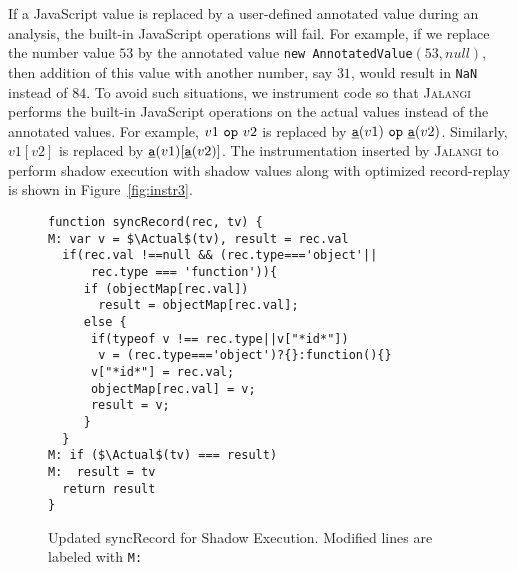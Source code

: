 \documentclass{sig-alternate}
\def\jalangi{\textsc{Jalangi}}
\newcommand \dsl [1] {\ensuremath{{\tt #1}}\xspace}
\newcommand \usl [1] {\mbox{\underline{\tt #1}}\xspace}
\newcommand \Actual{\usl{a}}
\begin{document}
If a JavaScript value is replaced by a user-defined annotated value
during an analysis, the built-in JavaScript operations will fail.  For
example, if we replace the number value $53$ by the annotated value
\texttt{new AnnotatedValue}$(53, null)$, then addition of this value
with another number, say $31$, would result in \texttt{NaN} instead of
$84$.  To avoid such situations, we instrument code so that \jalangi{}
performs the built-in JavaScript operations on the actual values
instead of the annotated values.  For example, $v1\ \dsl{op}\ v2$ is
replaced by $\Actual(v1)\ \dsl{op}\ \Actual(v2)$.  Similarly, $v1[v2]$
is replaced by $\Actual(v1)[\Actual(v2)]$.  The instrumentation
inserted by \jalangi{} to perform shadow execution with shadow values
along with optimized record-replay is shown in
Figure~\ref{fig:instr3}.

\lstset{language=JavaScript}
\begin{figure}
 {\small 
\begin{lstlisting}[mathescape]
function syncRecord(rec, tv) {
M: var v = $\Actual$(tv), result = rec.val
  if(rec.val !==null && (rec.type==='object'|| 
      rec.type === 'function')){
     if (objectMap[rec.val])
       result = objectMap[rec.val];
     else {
      if(typeof v !== rec.type||v["*id*"]) 
       v = (rec.type==='object')?{}:function(){}
      v["*id*"] = rec.val;
      objectMap[rec.val] = v;
      result = v;
     }
  }
M: if ($\Actual$(tv) === result)
M:  result = tv
  return result
}
\end{lstlisting}
}
  \caption{Updated syncRecord for Shadow Execution.  Modified lines
    are labeled with \texttt{M:}}
  \label{fig:lib3}
\end{figure}
\end{document}
